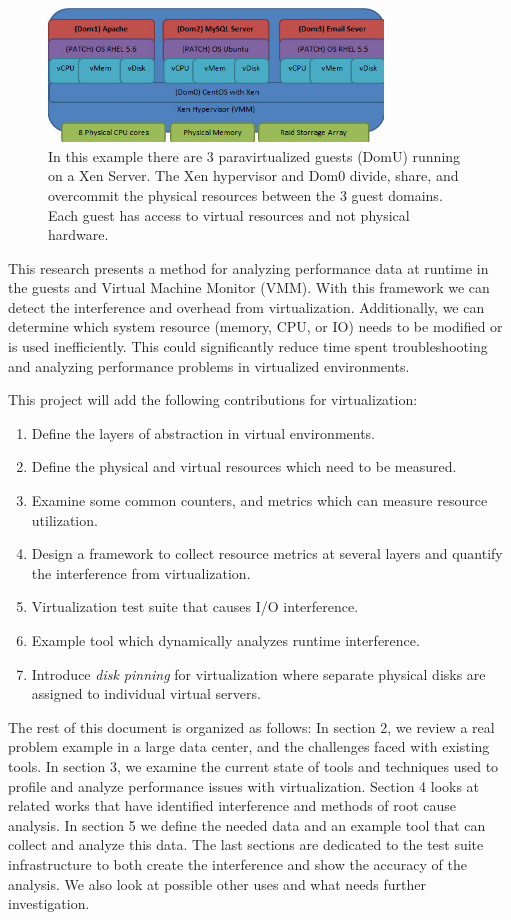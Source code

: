 \begin{figure}[!b]
  \begin{center}
    \includegraphics[width=3.5in]{images/VirtualizationExample.jpg}
  \end{center}
  \caption{\small In this example there are 3 paravirtualized guests (DomU) running on a Xen Server.  The Xen hypervisor and Dom0 divide, share, and overcommit the physical resources between the 3 guest domains.  Each guest has access to virtual resources and not physical hardware.}
  \label{virtStack}
\end{figure}

\indent This research presents a method for analyzing performance data at runtime in the guests and Virtual Machine Monitor (VMM).   With this framework we can detect the interference and overhead from virtualization.  Additionally, we can determine which system resource (memory, CPU, or IO) needs to be modified or is used inefficiently.  This could significantly reduce time spent troubleshooting and analyzing performance problems in virtualized environments.

\indent This project will add the following contributions for virtualization:
\begin{enumerate}
\item Define the layers of abstraction in virtual environments.
\item Define the physical and virtual resources which need to be measured.
\item Examine some common counters, and metrics which can measure resource utilization.
\item Design a framework to collect resource metrics at several layers and quantify the interference from virtualization.
\item Virtualization test suite that causes I/O interference.
\item Example tool which dynamically analyzes runtime interference.
\item Introduce \emph{disk pinning} for virtualization where separate physical disks are assigned to individual virtual servers.
\end{enumerate}

\indent The rest of this document is organized as follows:  In section 2, we review a real problem example in a large data center, and the challenges faced with existing tools.  In section 3, we examine the current state of tools and techniques used to profile and analyze performance issues with virtualization.  Section 4 looks at related works that have identified interference and methods of root cause analysis.  In section 5 we define the needed data and an example tool that can collect and analyze this data.  The last sections are dedicated to the test suite infrastructure to both create the interference and show the accuracy of the analysis.  We also look at possible other uses and what needs further investigation.
